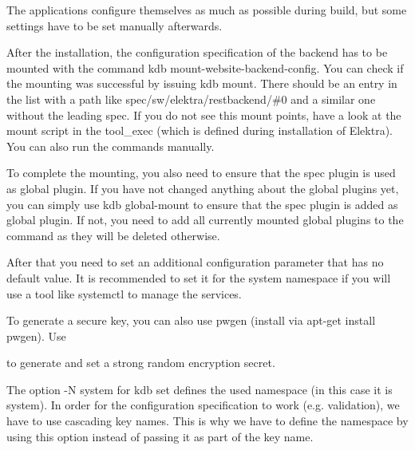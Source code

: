 The applications configure themselves as much as possible during build, but some settings have to be set manually afterwards.

After the installation, the configuration specification of the backend has to be mounted with the command {\ttfamily kdb mount-\/website-\/backend-\/config}. You can check if the mounting was successful by issuing {\ttfamily kdb mount}. There should be an entry in the list with a path like {\ttfamily spec/sw/elektra/restbackend/\#0} and a similar one without the leading {\ttfamily spec}. If you do not see this mount points, have a look at the mount script in the tool\+\_\+exec (which is defined during installation of Elektra). You can also run the commands manually.

To complete the mounting, you also need to ensure that the {\ttfamily spec} plugin is used as global plugin. If you have not changed anything about the global plugins yet, you can simply use {\ttfamily kdb global-\/mount} to ensure that the {\ttfamily spec} plugin is added as global plugin. If not, you need to add all currently mounted global plugins to the command as they will be deleted otherwise.

After that you need to set an additional configuration parameter that has no default value. It is recommended to set it for the system namespace if you will use a tool like {\ttfamily systemctl} to manage the services.


\begin{DoxyCode}{0}
\end{DoxyCode}


To generate a secure key, you can also use {\ttfamily pwgen} (install via {\ttfamily apt-\/get install pwgen}). Use


\begin{DoxyCode}{0}
\end{DoxyCode}


to generate and set a strong random encryption secret.

The option {\ttfamily -\/N system} for {\ttfamily kdb set} defines the used namespace (in this case it is {\ttfamily system}). In order for the configuration specification to work (e.\+g. validation), we have to use cascading key names. This is why we have to define the namespace by using this option instead of passing it as part of the key name.

